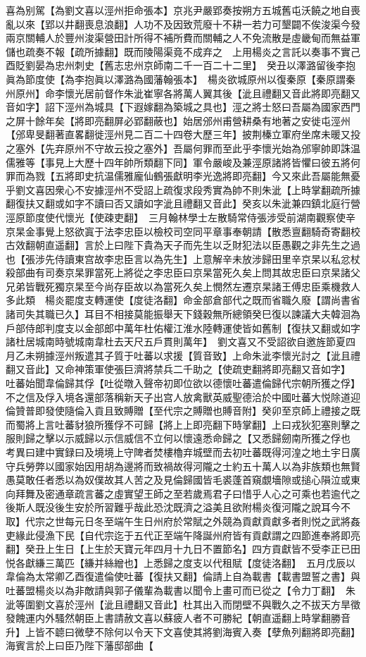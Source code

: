 喜為别駕【為劉文喜以涇州拒命張本】京兆尹嚴郢奏按朔方五城舊屯沃饒之地自喪亂以來【郢以井翻喪息浪翻】人功不及因致荒廢十不耕一若力可墾闢不俟浚渠今發兩京關輔人於豐州浚渠營田計所得不補所費而關輔之人不免流散是虛畿甸而無益軍儲也疏奏不報【疏所據翻】既而陵陽渠竟不成弃之　上用楊炎之言託以奏事不實己酉貶劉晏為忠州刺史【舊志忠州京師南二千一百二十二里】　癸丑以澤潞留後李抱眞為節度使【為李抱眞以澤潞為國藩翰張本】　楊炎欲城原州以復秦原【秦原謂秦州原州】命李懷光居前督作朱泚崔寧各將萬人翼其後【泚且禮翻又音此將即亮翻又音如字】詔下涇州為城具【下遐嫁翻為築城之具也】涇之將士怒曰吾屬為國家西門之屏十餘年矣【將即亮翻屏必郢翻蔽也】始居邠州甫營耕桑有地著之安徙屯涇州【邠卑旻翻著直畧翻徙涇州見二百二十四卷大歷三年】披荆榛立軍府坐席未暖又投之塞外【先弃原州不守故云投之塞外】吾屬何罪而至此乎李懷光始為邠寧帥即誅温儒雅等【事見上大歷十四年帥所類翻下同】軍令嚴峻及兼涇原諸將皆懼曰彼五將何罪而為戮【五將即史抗温儒雅龐仙鶴張獻明李光逸將即亮翻】今又來此吾屬能無憂乎劉文喜因衆心不安據涇州不受詔上疏復求段秀實為帥不則朱泚【上時掌翻疏所據翻復扶又翻或如字不讀曰否又讀如字泚且禮翻又音此】癸亥以朱泚兼四鎮北庭行營涇原節度使代懷光【使疎吏翻】　三月翰林學士左散騎常侍張涉受前湖南觀察使辛京杲金事覺上怒欲寘于法李忠臣以檢校司空同平章事奉朝請【散悉亶翻騎奇寄翻校古效翻朝直遥翻】言於上曰陛下貴為天子而先生以乏財犯法以臣愚觀之非先生之過也【張涉先侍讀東宫故李忠臣言以為先生】上意解辛未放涉歸田里辛京杲以私忿杖殺部曲有司奏京杲罪當死上將從之李忠臣曰京杲當死久矣上問其故忠臣曰京杲諸父兄弟皆戰死獨京杲至今尚存臣故以為當死久矣上憫然左遷京杲諸王傅忠臣乘機救人多此類　楊炎罷度支轉運使【度徒洛翻】命金部倉部代之既而省職久廢【謂尚書省諸司失其職已久】耳目不相接莫能振舉天下錢穀無所總領癸巳復以諫議大夫韓洄為戶部侍郎判度支以金部郎中萬年杜佑權江淮水陸轉運使皆如舊制【復扶又翻或如字諸杜居城南時號城南韋杜去天尺五戶貫則萬年】　劉文喜又不受詔欲自邀旌節夏四月乙未朔據涇州叛遣其子質于吐蕃以求援【質音致】上命朱泚李懷光討之【泚且禮翻又音此】又命神策軍使張巨濟將禁兵二千助之【使疏吏翻將即亮翻又音如字】　吐蕃始聞韋倫歸其俘【吐從暾入聲帝初即位欲以德懷吐蕃遣倫歸代宗朝所獲之俘】不之信及俘入境各還部落稱新天子出宫人放禽獸英威聖德洽於中國吐蕃大悦除道迎倫贊普即發使隨倫入貢且致賻贈【至代宗之賻贈也賻音附】癸卯至京師上禮接之既而蜀將上言吐蕃豺狼所獲俘不可歸【將上上即亮翻下時掌翻】上曰戎狄犯塞則擊之服則歸之擊以示威歸以示信威信不立何以懷遠悉命歸之【又悉歸劒南所獲之俘也　考異曰建中實録曰及境境上守陴者焚樓櫓弃城壁而去初吐蕃既得河湟之地土宇日廣守兵勞弊以國家始因用胡為邊將而致禍故得河隴之士約五十萬人以為非族類也無賢愚莫敢任者悉以為奴僕故其人苦之及見倫歸國皆毛裘蓬首窺覷墻隙或搥心隕泣或東向拜舞及密通章疏言蕃之虛實望王師之至若歲焉君子曰惜乎人心之可乘也若逾代之後斯人既没後生安於所習難乎哉此恐沈既濟之溢美且欲附楊炎復河隴之說耳今不取】代宗之世每元日冬至端午生日州府於常賦之外競為貢獻貢獻多者則悦之武將姦吏緣此侵漁下民【自代宗迄于五代正至端午降誕州府皆有貢獻謂之四節進奉將即亮翻】癸丑上生日【上生於天寶元年四月十九日不置節名】四方貢獻皆不受李正已田悦各獻縑三萬匹【縑并絲繒也】上悉歸之度支以代租賦【度徒洛翻】　五月戊辰以韋倫為太常卿乙酉復遣倫使吐蕃【復扶又翻】倫請上自為載書【載書盟誓之書】與吐蕃盟楊炎以為非敵請與郭子儀輩為載書以聞令上畫可而已從之【令力丁翻】　朱泚等圍劉文喜於涇州【泚且禮翻又音此】杜其出入而閉壁不與戰久之不拔天方旱徵發餽運内外騷然朝臣上書請赦文喜以蘇疲人者不可勝紀【朝直遥翻上時掌翻勝音升】上皆不聼曰微孽不除何以令天下文喜使其將劉海賓入奏【孽魚列翻將即亮翻】海賓言於上曰臣乃陛下藩邸部曲【